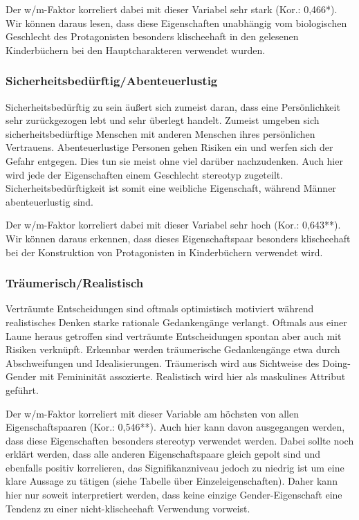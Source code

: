 Der w/m-Faktor korreliert dabei mit dieser Variabel sehr stark (Kor.:
0,466*). Wir können daraus lesen, dass diese Eigenschaften unabhängig
vom biologischen Geschlecht des Protagonisten besonders klischeehaft in
den gelesenen Kinderbüchern bei den Hauptcharakteren verwendet wurden.

\subsubsection{Sicherheitsbedürftig/Abenteuerlustig}

Sicherheitsbedürftig zu sein äußert sich zumeist daran, dass eine
Persönlichkeit sehr zurückgezogen lebt und sehr überlegt handelt.
Zumeist umgeben sich sicherheitsbedürftige Menschen mit anderen Menschen
ihres persönlichen Vertrauens. Abenteuerlustige Personen gehen Risiken
ein und werfen sich der Gefahr entgegen. Dies tun sie meist ohne viel
darüber nachzudenken. Auch hier wird jede der Eigenschaften einem
Geschlecht stereotyp zugeteilt. Sicherheitsbedürftigkeit ist somit eine
weibliche Eigenschaft, während Männer abenteuerlustig sind.

Der w/m-Faktor korreliert dabei mit dieser Variabel sehr hoch (Kor.:
0,643**). Wir können daraus erkennen, dass dieses Eigenschaftspaar
besonders klischeehaft bei der Konstruktion von Protagonisten in
Kinderbüchern verwendet wird.

\subsubsection{Träumerisch/Realistisch}

Verträumte Entscheidungen sind oftmals optimistisch motiviert während
realistisches Denken starke rationale Gedankengänge verlangt. Oftmals
aus einer Laune heraus getroffen sind verträumte Entscheidungen spontan
aber auch mit Risiken verknüpft. Erkennbar werden träumerische
Gedankengänge etwa durch Abschweifungen und Idealisierungen. Träumerisch
wird aus Sichtweise des Doing-Gender mit Femininität assozierte.
Realistisch wird hier als maskulines Attribut geführt.

Der w/m-Faktor korreliert mit dieser Variable am höchsten von allen
Eigenschaftspaaren (Kor.: 0,546**). Auch hier kann davon ausgegangen
werden, dass diese Eigenschaften besonders stereotyp verwendet werden.
Dabei sollte noch erklärt werden, dass alle anderen Eigenschaftspaare
gleich gepolt sind und ebenfalls positiv korrelieren, das
Signifikanzniveau jedoch zu niedrig ist um eine klare Aussage zu tätigen
(siehe Tabelle über Einzeleigenschaften). Daher kann hier nur soweit
interpretiert werden, dass keine einzige Gender-Eigenschaft eine Tendenz
zu einer nicht-klischeehaft Verwendung vorweist.

